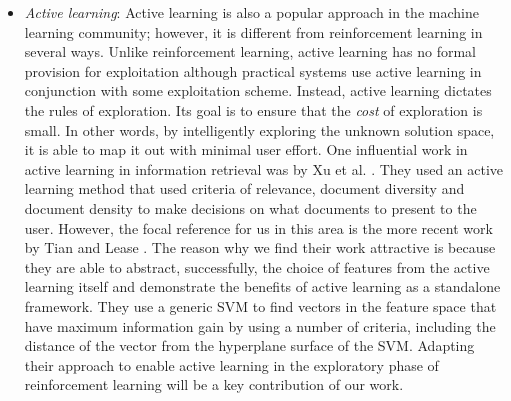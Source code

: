 \documentclass{acm_proc_article-sp}
\begin{document}
\begin{itemize}
\item \emph{Active learning}: Active learning is also a popular approach in the machine learning community; however, it is different from reinforcement learning in several ways. Unlike reinforcement learning, active learning has no formal provision for exploitation although practical systems use active learning in conjunction with some exploitation scheme. Instead, active learning dictates the rules of exploration. Its goal is to ensure that the \emph{cost} of exploration is small. In other words, by intelligently exploring the unknown solution space, it is able to map it out with minimal user effort. One influential work in active learning in information retrieval was by Xu et al. \cite{active2}. They used an active learning method that used criteria of relevance, document diversity and document density to make decisions on what documents to present to the user. However, the focal reference for us in this area is the more recent work by Tian and Lease \cite{aibo}. The reason why we find their work attractive is because they are able to abstract, successfully, the choice of features from the active learning itself and demonstrate the benefits of active learning as a standalone framework. They use a generic SVM to find vectors in the feature space that have maximum information gain by using a number of criteria, including the distance of the vector from the hyperplane surface of the SVM. Adapting their approach to enable active learning in the exploratory phase of reinforcement learning will be a key contribution of our work. 
\end{itemize}
\end{document}
